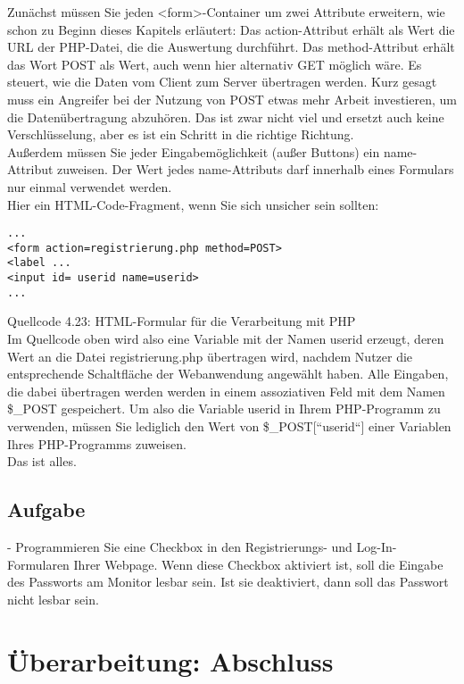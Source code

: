 Zunächst müssen Sie jeden <form>-Container um zwei Attribute erweitern, wie schon zu Beginn dieses Kapitels erläutert: Das action-Attribut erhält als Wert die URL der PHP-Datei, die die Auswertung durchführt. Das method-Attribut erhält das Wort POST als Wert, auch wenn hier alternativ GET möglich wäre. Es steuert, wie die Daten vom Client zum Server übertragen werden. Kurz gesagt muss ein Angreifer bei der Nutzung von POST etwas mehr Arbeit investieren, um die Datenübertragung abzuhören. Das ist zwar nicht viel und ersetzt auch keine Verschlüsselung, aber es ist ein Schritt in die richtige Richtung.\\

Außerdem müssen Sie jeder Eingabemöglichkeit (außer Buttons) ein name-Attribut zuweisen. Der Wert jedes name-Attributs darf innerhalb eines Formulars nur einmal verwendet werden.\\

Hier ein HTML-Code-Fragment, wenn Sie sich unsicher sein sollten:\\

\begin{verbatim}
...
<form action=registrierung.php method=POST>
<label ...
<input id= userid name=userid>
...
\end{verbatim}
Quellcode 4.23: HTML-Formular für die Verarbeitung mit PHP\\

Im Quellcode oben wird also eine Variable mit der Namen userid erzeugt, deren Wert an die Datei registrierung.php übertragen wird, nachdem Nutzer die entsprechende Schaltfläche der Webanwendung angewählt haben. Alle Eingaben, die dabei übertragen werden werden in einem assoziativen Feld mit dem Namen \$\_POST gespeichert. Um also die Variable userid in Ihrem PHP-Programm zu verwenden, müssen Sie lediglich den Wert von \$\_POST[``userid``] einer Variablen Ihres PHP-Programms zuweisen. \\

Das ist alles. 

\subsection{Aufgabe}

-	Programmieren Sie eine Checkbox in den Registrierungs- und Log-In-Formularen Ihrer Webpage. Wenn diese Checkbox aktiviert ist, soll die Eingabe des Passworts am Monitor lesbar sein. Ist sie deaktiviert, dann soll das Passwort nicht lesbar sein.

\section{Überarbeitung: Abschluss}

